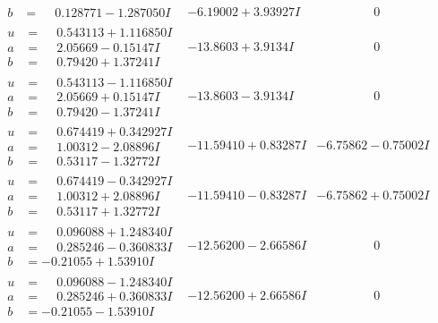 \documentclass[1p]{elsarticle_modified}
\theoremstyle{definition}
\begin{document}
$$\begin{array}{c|c|c}
\begin{aligned}
b &= \phantom{-}0.128771 - 1.287050 I\end{aligned}
 & -6.19002 + 3.93927 I & \phantom{-0.000000 } 0 \\ \hline\begin{aligned}
u &= \phantom{-}0.543113 + 1.116850 I \\
a &= \phantom{-}2.05669 - 0.15147 I \\
b &= \phantom{-}0.79420 + 1.37241 I\end{aligned}
 & -13.8603 + 3.9134 I & \phantom{-0.000000 } 0 \\ \hline\begin{aligned}
u &= \phantom{-}0.543113 - 1.116850 I \\
a &= \phantom{-}2.05669 + 0.15147 I \\
b &= \phantom{-}0.79420 - 1.37241 I\end{aligned}
 & -13.8603 - 3.9134 I & \phantom{-0.000000 } 0 \\ \hline\begin{aligned}
u &= \phantom{-}0.674419 + 0.342927 I \\
a &= \phantom{-}1.00312 - 2.08896 I \\
b &= \phantom{-}0.53117 - 1.32772 I\end{aligned}
 & -11.59410 + 0.83287 I & -6.75862 - 0.75002 I \\ \hline\begin{aligned}
u &= \phantom{-}0.674419 - 0.342927 I \\
a &= \phantom{-}1.00312 + 2.08896 I \\
b &= \phantom{-}0.53117 + 1.32772 I\end{aligned}
 & -11.59410 - 0.83287 I & -6.75862 + 0.75002 I \\ \hline\begin{aligned}
u &= \phantom{-}0.096088 + 1.248340 I \\
a &= \phantom{-}0.285246 - 0.360833 I \\
b &= -0.21055 + 1.53910 I\end{aligned}
 & -12.56200 - 2.66586 I & \phantom{-0.000000 } 0 \\ \hline\begin{aligned}
u &= \phantom{-}0.096088 - 1.248340 I \\
a &= \phantom{-}0.285246 + 0.360833 I \\
b &= -0.21055 - 1.53910 I\end{aligned}
 & -12.56200 + 2.66586 I & \phantom{-0.000000 } 0 \\ \hline\begin{aligned}

\end{aligned}
\end{array}$$
\end{document}
